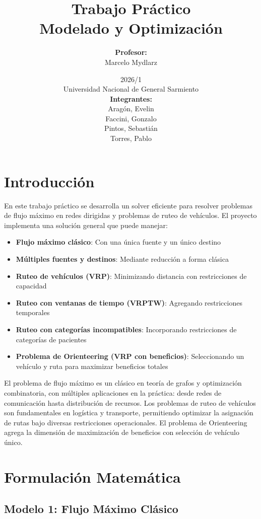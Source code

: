 \documentclass[12pt]{article}
\title{\Huge Trabajo Práctico\\\Large Modelado y Optimización}
\date{
    \large 2026/1 \\
    Universidad Nacional de General Sarmiento \\
    \vspace{2cm}
    \hfill \textbf{Integrantes:}\\
    \hfill Aragón, Evelin\\
    \hfill Faccini, Gonzalo\\
    \hfill Pintos, Sebastián\\
    \hfill Torres, Pablo
}
\author{\textbf{Profesor:}\\Marcelo Mydlarz}
\begin{document}
\maketitle
\newpage
\tableofcontents
\newpage

\section{Introducción}

En este trabajo práctico se desarrolla un solver eficiente para resolver problemas de flujo máximo en redes dirigidas y problemas de ruteo de vehículos. El proyecto implementa una solución general que puede manejar:

\begin{itemize}
    \item \textbf{Flujo máximo clásico}: Con una única fuente y un único destino
    \item \textbf{Múltiples fuentes y destinos}: Mediante reducción a forma clásica
    \item \textbf{Ruteo de vehículos (VRP)}: Minimizando distancia con restricciones de capacidad
    \item \textbf{Ruteo con ventanas de tiempo (VRPTW)}: Agregando restricciones temporales
    \item \textbf{Ruteo con categorías incompatibles}: Incorporando restricciones de categorías de pacientes
    \item \textbf{Problema de Orienteering (VRP con beneficios)}: Seleccionando un vehículo y ruta para maximizar beneficios totales
\end{itemize}

El problema de flujo máximo es un clásico en teoría de grafos y optimización combinatoria, con múltiples aplicaciones en la práctica: desde redes de comunicación hasta distribución de recursos. Los problemas de ruteo de vehículos son fundamentales en logística y transporte, permitiendo optimizar la asignación de rutas bajo diversas restricciones operacionales. El problema de Orienteering agrega la dimensión de maximización de beneficios con selección de vehículo único.

\newpage
\section{Formulación Matemática}

\subsection{Modelo 1: Flujo Máximo Clásico}
\end{document}
